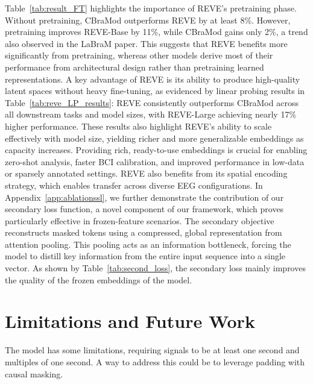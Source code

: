 \documentclass{article}
\begin{document}
Table~\ref{tab:result_FT} highlights the importance of REVE’s pretraining phase. Without pretraining, CBraMod outperforms REVE by at least 8\%. However, pretraining improves REVE-Base by 11\%, while CBraMod gains only 2\%, a trend also observed in the LaBraM paper. This suggests that REVE benefits more significantly from pretraining, whereas other models derive most of their performance from architectural design rather than pretraining learned representations. A key advantage of REVE is its ability to produce high-quality latent spaces without heavy fine-tuning, as evidenced by linear probing results in Table~\ref{tab:reve_LP_results}: REVE consistently outperforms CBraMod across all downstream tasks and model sizes, with REVE-Large achieving nearly 17\% higher performance. These results also highlight REVE’s ability to scale effectively with model size, yielding richer and more generalizable embeddings as capacity increases. Providing rich, ready-to-use embeddings is crucial for enabling zero-shot analysis, faster BCI calibration, and improved performance in low-data or sparsely annotated settings. REVE also benefits from its spatial encoding strategy, which enables transfer across diverse EEG configurations. In Appendix~\ref{app:ablationssl}, we further demonstrate the contribution of our secondary loss function, a novel component of our framework, which proves particularly effective in frozen-feature scenarios. The secondary objective reconstructs masked tokens using a compressed, global representation from attention pooling. This pooling acts as an information bottleneck, forcing the model to distill key information from the entire input sequence into a single vector. As shown by Table~\ref{tab:second_loss}, the secondary loss mainly improves the quality of the frozen embeddings of the model.

\section{Limitations and Future Work}

The model has some limitations, requiring signals to be at least one second and multiples of one second. A way to address this could be to leverage padding with causal masking. %
\end{document}
